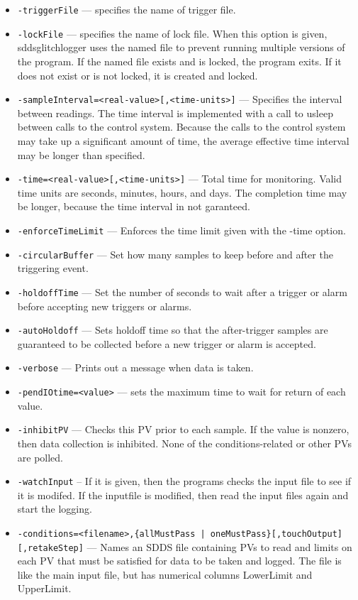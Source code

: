 \begin{itemize}
\begin{itemize}
        \item {\tt -triggerFile} --- specifies the name of trigger file.
        \item {\tt -lockFile} --- specifies the name of lock file. When this option is given,
                sddsglitchlogger uses the named file to prevent running multiple versions of
                the program.  If the named file exists and is locked, the program exits.  
                If it does not exist or is not locked, it is created and locked.
        \item {\tt -sampleInterval=<real-value>[,<time-units>]} --- Specifies the interval between readings.
                The time interval is implemented with a call to usleep between calls to the control system.
                Because the calls to the control system may take up a significant amount of time, the average
                effective time interval may be longer than specified.
        \item {\tt -time=<real-value>[,<time-units>]} --- Total time for monitoring. Valid time units are
                seconds, minutes, hours, and days. The completion time may be longer, because the time 
                interval in not garanteed.
        \item {\tt -enforceTimeLimit} --- Enforces the time limit given with the -time option.
        \item {\tt -circularBuffer} --- Set how many samples to keep before and after the triggering event.
        \item {\tt -holdoffTime} --- Set the number of seconds to wait after a trigger or alarm before 
                accepting new triggers or alarms.
        \item {\tt -autoHoldoff} --- Sets holdoff time so that the after-trigger samples are guaranteed 
                to be collected before a new trigger or alarm is accepted.
        \item {\tt -verbose} --- Prints out a message when data is taken.
        \item {\tt -pendIOtime=<value>} --- sets the maximum time to wait for return of each value.
        \item {\tt -inhibitPV} --- Checks this PV prior to each sample.  If the value is nonzero, 
                then data collection is inhibited.  None of the conditions-related or other PVs are polled.
        \item {\tt -watchInput} -- If it is given, then the programs checks the input file to see if
                it is modifed. If the inputfile is modified, then read the input files again and start
                the logging.
        \item {\verb+-conditions=<filename>,{allMustPass | oneMustPass}[,touchOutput][,retakeStep]+} --- 
                   Names an SDDS file containing PVs to read and limits on each PV that must
                   be satisfied for data to be taken and logged.  The file is like the main
                   input file, but has numerical columns LowerLimit and UpperLimit.


\end{itemize}
\end{itemize}
